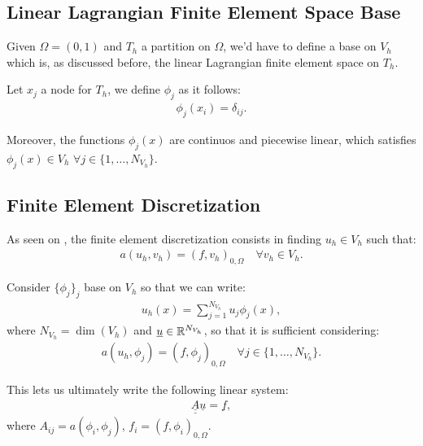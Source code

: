 \subsection{Linear Lagrangian Finite Element Space Base}

Given $\Omega = (0, 1)$ and $T_h$ a partition on $\Omega$, we'd have to define a base on $V_h$ which is, as discussed before, the linear Lagrangian finite element space on $T_h$.

Let $x_j$ a node for $T_h$, we define $\phi_j$ as it follows:
\begin{gather}
	\phi_j(x_i) = \delta_{ij}.
\end{gather}

Moreover, the functions $\phi_j(x)$ are continuos and piecewise linear, which satisfies $\phi_j(x) \in V_h$ $\forall j \in \{1, \dots, N_{V_h}\}$.

\subsection{Finite Element Discretization}

As seen on , the finite element discretization consists in finding $u_h \in V_h$ such that:
\begin{gather}
	a(u_h, v_h) = (f, v_h)_{0, \Omega} \quad \forall v_h \in V_h.
\end{gather}

Consider $\{\phi_j\}_j$ base on $V_h$ so that we can write:
\begin{gather}
	u_h(x) = \sum_{j = 1}^{N_{V_h}} u_j \phi_j(x),
\end{gather}
where $N_{V_h} = \dim(V_h)$ and $\underline{u} \in \mathbb{R}^{N_{V_h}}$, so that it is sufficient considering:
\begin{gather}
	a(u_h, \phi_j) = (f, \phi_j)_{0, \Omega} \quad \forall j \in \{1, \dots, N_{V_h}\}.
\end{gather}

This lets us ultimately write the following linear system:
\begin{gather}
	\underline{\underline{A}} \underline{u} = \underline{f},
\end{gather}
where $A_{ij} = a(\phi_i, \phi_j)$, $f_i = (f, \phi_i)_{0, \Omega}$.